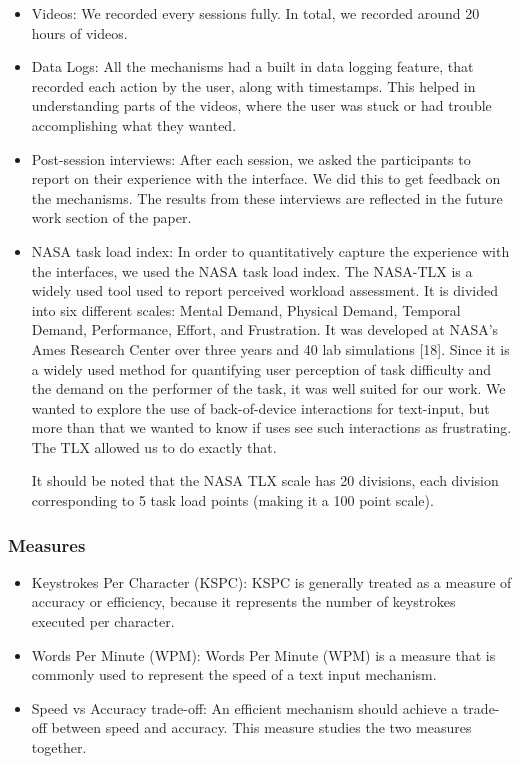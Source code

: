 \begin{itemize}
\item Videos: We recorded every sessions fully. In total, we recorded
  around 20 hours of videos.
\item Data Logs: All the mechanisms had a built in data logging
  feature, that recorded each action by the user, along with
  timestamps. This helped in understanding parts of the videos, where
  the user was stuck or had trouble accomplishing what they wanted.
\item Post-session interviews: After each session, we asked the
  participants to report on their experience with the interface. We
  did this to get feedback on the mechanisms.  The results from
  these interviews are reflected in the future work section of the
  paper.
\item NASA task load index: In order to quantitatively capture the
  experience with the interfaces, we used the NASA task load
  index. The NASA-TLX is a widely used tool used to report perceived
  workload assessment. It is divided into six different scales: Mental
  Demand, Physical Demand, Temporal Demand, Performance, Effort, and
  Frustration. It was developed at NASA's Ames Research Center over
  three years and 40 lab simulations [18]. Since it is a widely used
  method for quantifying user perception of task difficulty and the
  demand on the performer of the task, it was well suited for our
  work. We wanted to explore the use of back-of-device interactions
  for text-input, but more than that we wanted to know if uses see
  such interactions as frustrating. The TLX allowed us to do exactly
  that.

  It should be noted that the NASA TLX scale has 20 divisions, each
  division corresponding to 5 task load points (making it a 100 point
  scale).

\end{itemize}


\subsubsection{Measures}
\begin{itemize}
\item Keystrokes Per Character (KSPC): KSPC is generally treated as a
  measure of accuracy or efficiency, because it represents the number of keystrokes
  executed per character.  
\item Words Per Minute (WPM): Words Per Minute (WPM) is a measure that
  is commonly used to represent the speed of a text input mechanism.
\item Speed vs Accuracy trade-off: An efficient mechanism should
  achieve a trade-off between speed and accuracy. This measure studies
  the two measures together.
\end{itemize}

